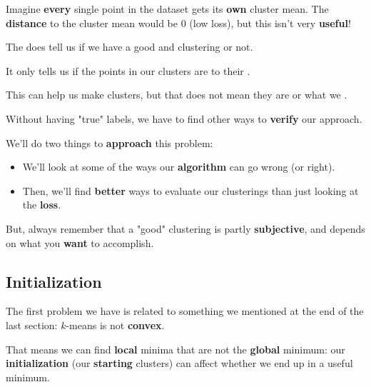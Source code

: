     \miniex Imagine \textbf{every} single point in the dataset gets its \textbf{own} cluster mean. The \textbf{distance} to the cluster mean would be 0 (low loss), but this isn't very \textbf{useful}!
        \\
    
    \begin{clarification}
        The  does  tell us if we have a good and  clustering or not.
        
        It only tells us if the points in our clusters are  to their .
        
        This can help us make  clusters, but that does not mean they are  or what we .
    \end{clarification}
    
    Without having "true" labels, we have to find other ways to \textbf{verify} our approach.
    
    We'll do two things to \textbf{approach} this problem:
    
    \begin{itemize}
        \item We'll look at some of the ways our \textbf{algorithm} can go wrong (or right).
        
        \item Then, we'll find \textbf{better} ways to evaluate our clusterings than just looking at the \textbf{loss}.
    \end{itemize}
    
    But, always remember that a "good" clustering is partly \textbf{subjective}, and depends on what you \textbf{want} to accomplish.

    \subsection{Initialization}
    
        The first problem we have is related to something we mentioned at the end of the last section: $k$-means is not \textbf{convex}. 
        
        That means we can find \textbf{local} minima that are not the \textbf{global} minimum: our \textbf{initialization} (our \textbf{starting} clusters) can affect whether we end up in a useful minimum.
            
